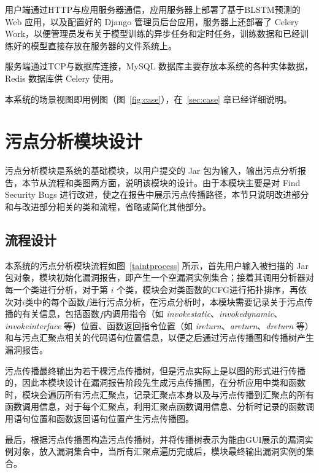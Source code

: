用户端通过HTTP与应用服务器通信，应用服务器上部署了基于BLSTM预测的 Web 应用，以及配置好的 Django 管理员后台应用，服务器上还部署了 Celery Work，以便管理员发布关于模型训练的异步任务和定时任务，训练数据和已经训练好的模型直接存放在服务器的文件系统上。

服务端通过TCP与数据库连接，MySQL 数据库主要存放本系统的各种实体数据，Redis 数据库供 Celery 使用。


本系统的场景视图即用例图（图~\ref{fig:case}），在~\ref{sec:case} 章已经详细说明。

\section{污点分析模块设计}

污点分析模块是系统的基础模块，以用户提交的 Jar 包为输入，输出污点分析报告，本节从流程和类图两方面，说明该模块的设计。由于本模块主要是对 Find Security Bugs 进行改进，使之在报告中展示污点传播路径，本节只说明改进部分和与改进部分相关的类和流程，省略或简化其他部分。

\subsection{流程设计}
本系统的污点分析模块流程如图~\ref{taintprocess} 所示，首先用户输入被扫描的 Jar 包对象，模块初始化漏洞报告，即产生一个空漏洞实例集合；接着其调用分析器对每一个类进行分析，对于第 $i$ 个类，模块会对类函数的CFG进行拓扑排序，再依次对$i$类中的每个函数$f$进行污点分析，在污点分析时，本模块需要记录关于污点传播的有关信息，包括函数$f$内调用指令（如 \textit{invokestatic}、\textit{invokedynamic}、\textit{invokeinterface} 等）位置、函数返回指令位置（如 \textit{ireturn}、\textit{areturn}、\textit{dreturn} 等）和与污点汇聚点相关的代码语句位置信息，以便之后通过污点传播图和传播树产生漏洞报告。

污点传播最终输出为若干棵污点传播树，但是污点实际上是以图的形式进行传播的，因此本模块设计在漏洞报告阶段先生成污点传播图，在分析应用中类和函数时，模块会遍历所有污点汇聚点，记录汇聚点本身以及与污点传播到汇聚点的所有函数调用信息，对于每个汇聚点，利用汇聚点函数调用信息、分析时记录的函数调用语句位置和函数返回语句位置产生污点传播图。

最后，根据污点传播图构造污点传播树，并将传播树表示为能由GUI展示的漏洞实例对象，放入漏洞集合中，当所有汇聚点遍历完成后，模块最终输出漏洞实例的集合。

